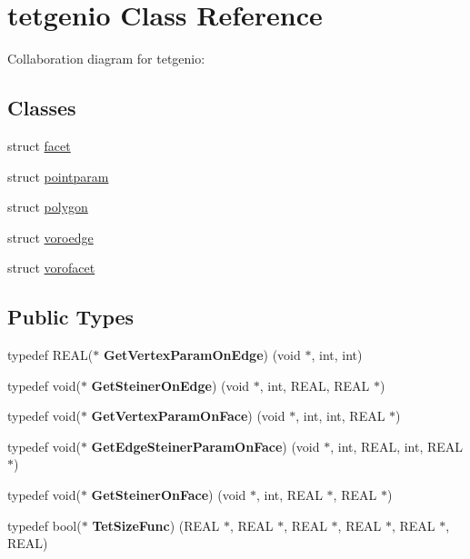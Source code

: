 \hypertarget{classtetgenio}{}\section{tetgenio Class Reference}
\label{classtetgenio}


Collaboration diagram for tetgenio\+:
\subsection*{Classes}
\begin{DoxyCompactItemize}
\item 
struct \hyperlink{structtetgenio_1_1facet}{facet}
\item 
struct \hyperlink{structtetgenio_1_1pointparam}{pointparam}
\item 
struct \hyperlink{structtetgenio_1_1polygon}{polygon}
\item 
struct \hyperlink{structtetgenio_1_1voroedge}{voroedge}
\item 
struct \hyperlink{structtetgenio_1_1vorofacet}{vorofacet}
\end{DoxyCompactItemize}
\subsection*{Public Types}
\begin{DoxyCompactItemize}
\item 
\mbox{\label{classtetgenio_a9b66695edca7918733cccf3e44c95e3d}} 
typedef R\+E\+AL($\ast$ {\bfseries Get\+Vertex\+Param\+On\+Edge}) (void $\ast$, int, int)
\item 
\mbox{\label{classtetgenio_a1c16b3a4c3d5a0166f989fa62a0ea575}} 
typedef void($\ast$ {\bfseries Get\+Steiner\+On\+Edge}) (void $\ast$, int, R\+E\+AL, R\+E\+AL $\ast$)
\item 
\mbox{\label{classtetgenio_a331721b37f6937630548cb659642f926}} 
typedef void($\ast$ {\bfseries Get\+Vertex\+Param\+On\+Face}) (void $\ast$, int, int, R\+E\+AL $\ast$)
\item 
\mbox{\label{classtetgenio_ad0078621198b377323d048cbcb2fe276}} 
typedef void($\ast$ {\bfseries Get\+Edge\+Steiner\+Param\+On\+Face}) (void $\ast$, int, R\+E\+AL, int, R\+E\+AL $\ast$)
\item 
\mbox{\label{classtetgenio_a3e77872e867758e38d5682a3042119d2}} 
typedef void($\ast$ {\bfseries Get\+Steiner\+On\+Face}) (void $\ast$, int, R\+E\+AL $\ast$, R\+E\+AL $\ast$)
\item 
\mbox{\label{classtetgenio_a9be33b16e8ace07e123954b4f10629e5}} 
typedef bool($\ast$ {\bfseries Tet\+Size\+Func}) (R\+E\+AL $\ast$, R\+E\+AL $\ast$, R\+E\+AL $\ast$, R\+E\+AL $\ast$, R\+E\+AL $\ast$, R\+E\+AL)
\end{DoxyCompactItemize}
